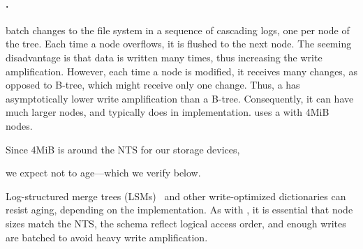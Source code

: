 \paragraph{\bets.}  \bets batch changes to the file system in a sequence of
cascading logs, one per node of the tree.  Each time a node overflows, it is
flushed to the next node.  The seeming disadvantage is that data is written
many times, thus increasing the write amplification.  However, each time a node
is modified, it receives many changes, as opposed to B-tree, which might
receive only one change.  Thus, a \bet has asymptotically lower write
amplification than a B-tree.  Consequently, it can have much larger nodes, and
typically does in implementation.  \betrfs uses a \bet with 4MiB nodes.  

Since 4MiB is around the NTS for our storage devices,

we expect \betrfs not to age---which we verify below.

Log-structured merge trees (LSMs)~\cite{DBLP:journals/acta/ONeilCGO96} and
other write-optimized dictionaries can resist aging, depending on the
implementation.  As with \bets, it is essential that node sizes match the NTS,
the schema reflect logical access order, and enough writes are batched to avoid
heavy write amplification.  
